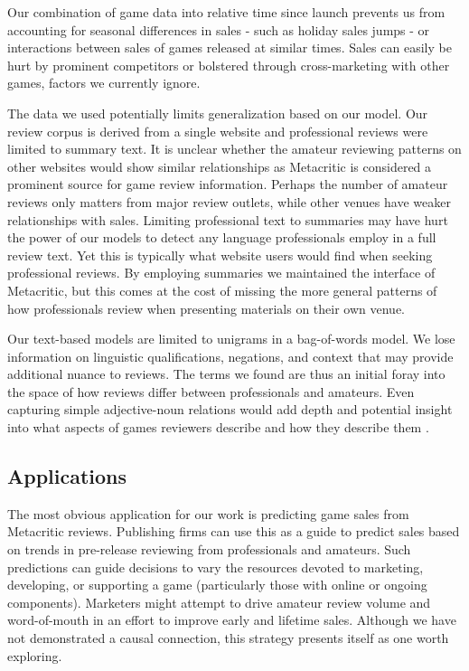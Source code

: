 \documentclass[letterpaper]{article}
\begin{document}
Our combination of game data into relative time since launch prevents us from accounting for seasonal differences in sales - such as holiday sales jumps - or interactions between sales of games released at similar times. Sales can easily be hurt by prominent competitors or bolstered through cross-marketing with other games, factors we currently ignore.

The data we used potentially limits generalization based on our model. Our review corpus is derived from a single website and professional reviews were limited to summary text. It is unclear whether the amateur reviewing patterns on other websites would show similar relationships as Metacritic is considered a prominent source for game review information. Perhaps the number of amateur reviews only matters from major review outlets, while other venues have weaker relationships with sales. Limiting professional text to summaries may have hurt the power of our models to detect any language professionals employ in a full review text. Yet this is typically what website users would find when seeking professional reviews. By employing summaries we maintained the interface of Metacritic, but this comes at the cost of missing the more general patterns of how professionals review when presenting materials on their own venue.

Our text-based models are limited to unigrams in a bag-of-words model. We lose information on linguistic qualifications, negations, and context that may provide additional nuance to reviews. The terms we found are thus an initial foray into the space of how reviews differ between professionals and amateurs. Even capturing simple adjective-noun relations would add depth and potential insight into what aspects of games reviewers describe and how they describe them \cite{zagal2011natural}.

\subsection{Applications}
The most obvious application for our work is predicting game sales from Metacritic reviews. Publishing firms can use this as a guide to predict sales based on trends in pre-release reviewing from professionals and amateurs. Such predictions can guide decisions to vary the resources devoted to marketing, developing, or supporting a game (particularly those with online or ongoing components). Marketers might attempt to drive amateur review volume and word-of-mouth in an effort to improve early and lifetime sales. Although we have not demonstrated a causal connection, this strategy presents itself as one worth exploring.
\end{document}
